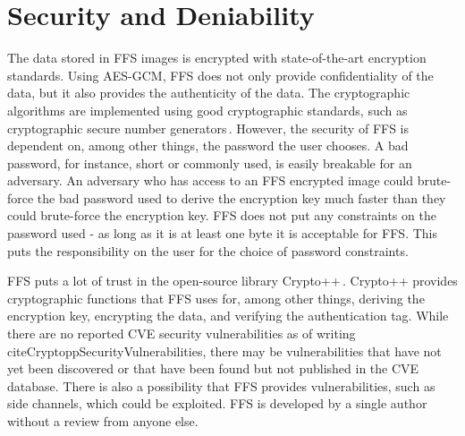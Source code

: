 \section{Security and Deniability}
The data stored in \gls{FFS} images is encrypted with state-of-the-art encryption standards. Using \gls{AES}-\gls{GCM}, \gls{FFS} does not only provide confidentiality of the data, but it also provides the authenticity of the data. The cryptographic algorithms are implemented using good cryptographic standards, such as cryptographic secure number generators\,\cite{RandomNumberGeneratorCryptoWiki2021}. However, the security of \gls{FFS} is dependent on, among other things, the password the user chooses. A bad password, for instance, short or commonly used, is easily breakable for an adversary. An adversary who has access to an \gls{FFS} encrypted image could brute-force the bad password used to derive the encryption key much faster than they could brute-force the encryption key. \gls{FFS} does not put any constraints on the password used - as long as it is at least one byte it is acceptable for \gls{FFS}. This puts the responsibility on the user for the choice of password constraints. 

FFS puts a lot of trust in the open-source library Crypto++\,\cite{CryptoLibraryFree}. Crypto++ provides cryptographic functions that \gls{FFS} uses for, among other things, deriving the encryption key, encrypting the data, and verifying the authentication tag. While there are no reported CVE security vulnerabilities as of writing\,cite{CryptoppSecurityVulnerabilities}, there may be vulnerabilities that have not yet been discovered or that have been found but not published in the CVE database. There is also a possibility that \gls{FFS} provides vulnerabilities, such as side channels, which could be exploited. \gls{FFS} is developed by a single author without a review from anyone else.


